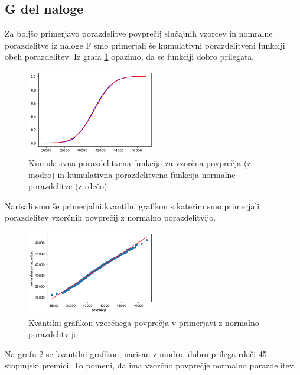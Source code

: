 \documentclass{article}
\begin{document}

\subsection{G del naloge}
Za boljšo primerjavo porazdelitve povprečij slučajnih vzorcev in nomralne porazdelitve iz naloge F
smo primerjali še kumulativni porazdelitveni funkciji obeh porazdelitev.
Iz grafa \ref*{CDFpovprecja} opazimo, da se funkciji dobro prilegata.
\begin{figure}[H]
    \begin{center}
        \includegraphics*[width=0.5\textwidth]{figure1G.png}
        \caption{Kumulativna porazdelitvena funkcija za vzorčna povprečja (z modro) in kumulativna porazdelitvena funkcija normalne porazdelitve (z rdečo)}
        \label{CDFpovprecja}
    \end{center}
\end{figure}

Narisali smo še primerjalni kvantilni grafikon s katerim smo primerjali porazdelitev vzorčnih povprečij z
normalno porazdelitvijo.
\begin{figure}[H]
    \begin{center}
        \includegraphics*[width=0.5\textwidth]{figure1G(1).png}
        \caption{Kvantilni grafikon vzorčnega povprečja v primerjavi z normalno porazdelitvijo }
        \label{QQvzor}
    \end{center}
\end{figure}
Na grafu \ref*{QQvzor} se kvantilni grafikon, narisan z modro, dobro prilega rdeči 45-stopinjski premici.
To pomeni, da ima vzorčno povprečje normalno porazdelitev.
\end{document}
